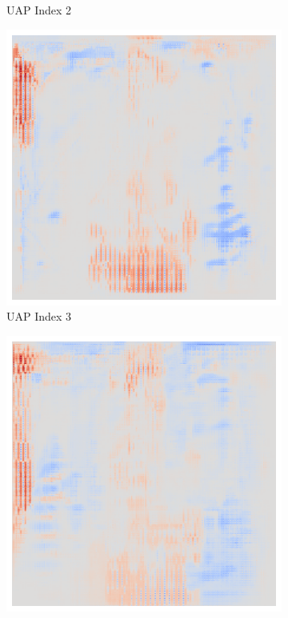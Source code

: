 \begin{figure}[ht!]
\begin{subfigure}{0.19\linewidth}
        \caption{UAP Index 2}
    \end{subfigure}\hfill%
    \begin{subfigure}{0.19\linewidth}
        \centering
        \includegraphics[height=1\linewidth]{01-images/05-resultate/uap_efficientnet/uap3-efficientnetv2m-covid-n200-robustificationslevel0.png}
        \caption{UAP Index 3}
    \end{subfigure}\hfill%
    \begin{subfigure}{0.19\linewidth}
        \centering
        \includegraphics[height=1\linewidth]{01-images/05-resultate/uap_efficientnet/uap4-efficientnetv2m-covid-n200-robustificationslevel0.png}

\end{subfigure}
\end{figure}
